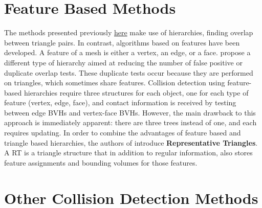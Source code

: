 \section{Feature Based Methods}
\label{sec:feature}

The methods presented previously \hyperref[sec:bvh]{here} make use of hierarchies, finding overlap between triangle pairs. In contrast, algorithms based on features have been developed. A feature of a mesh is either a vertex, an edge, or a face. \citep{curtis2008} propose a different type of hierarchy aimed at reducing the number of false positive or duplicate overlap tests. These duplicate tests occur because they are performed on triangles, which sometimes share features. Collision detection using feature-based hierarchies require three structures for each object, one for each type of feature (vertex, edge, face), and contact information is received by testing between edge BVHs and vertex-face BVHs. However, the main drawback to this approach is immediately apparent: there are three trees instead of one, and each requires updating. In order to combine the advantages of feature based and triangle based hierarchies, the authors of \citep{curtis2008} introduce \textbf{Representative Triangles}. A RT is a triangle structure that in addition to regular information, also stores feature assignments and bounding volumes for those features.


\section{Other Collision Detection Methods}
\label{sec:others}


